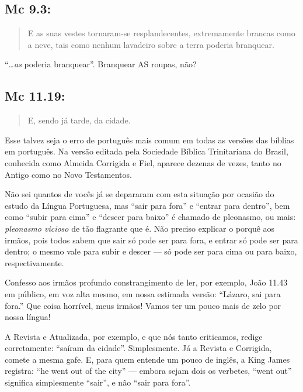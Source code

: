 \subsection*{Mc 9.3:}
\begin{quote}
    \small
E as suas vestes tornaram-se resplandecentes, extremamente brancas como a neve, tais como nenhum lavadeiro sobre a terra  poderia branquear.
\end{quote}

``\ldots \emph{as} poderia branquear''. Branquear AS roupas, não?


\subsection*{Mc 11.19:}\label{saiu}
\begin{quote}
    \small
E, sendo já tarde,  da cidade.
\end{quote}

Esse talvez seja o erro de português mais comum em todas as versões das bíblias em português. Na versão editada pela Sociedade Bíblica Trinitariana do Brasil, conhecida como Almeida Corrigida e Fiel, aparece dezenas de vezes, tanto no Antigo como no Novo Testamentos.

Não sei quantos de vocês já se depararam com esta situação por ocasião
do estudo da Língua Portuguesa, mas ``sair para fora'' e ``entrar para
dentro'', bem como ``subir para cima'' e ``descer para baixo'' é
chamado de pleonasmo, ou mais: \emph{pleonasmo vicioso} de tão flagrante que
é. Não preciso explicar o porquê aos irmãos, pois todos sabem que sair
só pode ser para fora, e entrar só pode ser para dentro; o mesmo vale
para subir e descer --- só pode ser para cima ou para baixo,
respectivamente.

Confesso aos irmãos profundo constrangimento de ler, por exemplo,
João 11.43 em público, em voz alta mesmo, em nossa estimada versão:
``Lázaro, sai para fora.'' Que coisa horrível, meus irmãos! Vamos ter
um pouco mais de zelo por nossa língua!

A Revista e Atualizada, por exemplo, e que nós tanto criticamos,
redige corretamente: ``saíram da cidade''. Simplesmente. Já a Revista
e Corrigida, comete a mesma gafe. E, para quem entende um pouco de
inglês, a King James registra: ``he went out of the city'' --- embora
sejam dois os verbetes, ``went out'' significa simplesmente ``sair'',
e não ``sair para fora''.

